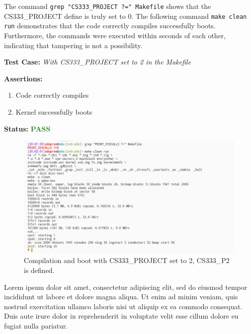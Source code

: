 \documentclass[11pt,letterpaper]{report}
\newcommand{\code}[1]{\colorbox{codegray}{\texttt{#1}}}
\begin{document}
{  The command \code{grep "CS333\_PROJECT ?=" Makefile} shows that the CS333\_PROJECT define is truly set to 0.
  The following command \code{make clean run} demonstrates that the code correctly compiles successfully boots. 
  Furthermore, the commands were executed within seconds of each other, indicating that
  tampering is not a possibility.

\pagebreak

  \noindent\textbf{Test Case:} \emph{With CS333\_PROJECT set to 2 in the Makefile}
  
  \noindent\textbf{Assertions:}
  \begin{enumerate}[]
  \item Code correctly compiles
  \item Kernel successfully boots
  \end{enumerate}  
  
  \noindent\textbf{Status:} \textcolor{ForestGreen}{\textbf{PASS}}
  
  \begin{figure}[h!]
	\centering
	\includegraphics[width=1\linewidth]{test1.png}
	\caption[img]{Compilation and boot with CS333\_PROJECT set to 2, CS333\_P2 is defined.}
	\label{fig:P1compileP0-1}
  \end{figure}

  Lorem ipsum dolor sit amet, consectetur adipiscing elit, sed do eiusmod 
  tempor incididunt ut labore et dolore magna aliqua. Ut enim ad minim 
  veniam, quis nostrud exercitation ullamco laboris nisi ut aliquip ex ea 
  commodo consequat. Duis aute irure dolor in reprehenderit in voluptate 
  velit esse cillum dolore eu fugiat nulla pariatur. 

  \pagebreak

\ifdefined \LF
} %
\fi
\end{document}
